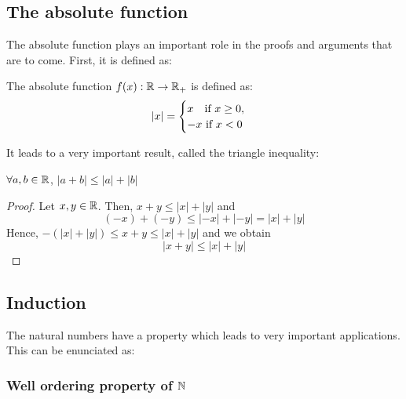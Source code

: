 \subsection{The absolute function}

The absolute function plays an important role in the proofs and arguments that are to come. First, it is defined as:

\begin{definition}
    The absolute function $f(x): \mathbb{R} \to \mathbb{R}_+$ is defined as:
    \begin{equation}
        |x| = \begin{cases}
            x \: \: \:\textnormal{ if } x \geq 0, \\
            -x \textnormal{ if } x < 0
        \end{cases}
    \end{equation}
\end{definition}

\vspace{1em}
It leads to a very important result, called the triangle inequality:

\begin{theorem}
    $\forall a, b \in \mathbb{R}$, $|a+b| \leq |a| + |b|$
\end{theorem}

\begin{proof}
    Let $x, y \in \mathbb{R}$. Then, $x + y \leq |x| + |y|$ and
    \begin{equation*}
        (-x) + (-y) \leq |-x|+|-y| = |x| + |y|
    \end{equation*}
    Hence, $-(|x|+|y|) \leq x+y \leq |x| + |y|$ and we obtain
    \begin{equation*}
        |x+y| \leq |x| + |y|
    \end{equation*}
\end{proof}

\subsection{Induction}

The natural numbers have a property which leads to very important applications. This can be enunciated as:

\subsubsection{Well ordering property of $\mathbb{N}$}

